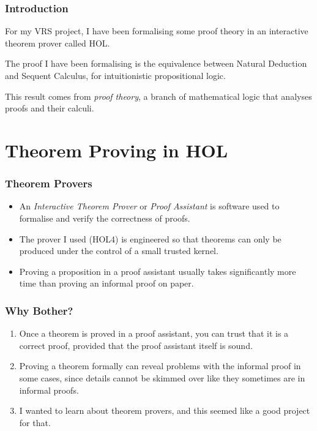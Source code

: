 \documentclass[english,svgnames,hide notes,12pt]{beamer}
\title{\large\presentationtitle}
\author{Alexander Cox\\
		\small Supervised by Michael Norrish\\
		\small The Australian National University
	}
\date{\today}
\theoremstyle{definition}
\theoremstyle{remark}
\begin{document}
\thispagestyle{empty}
\begin{frame}
    \titlepage{}
\end{frame}

\begin{frame}
    \frametitle{Introduction}
    For my VRS project, I have been formalising some proof theory in an interactive theorem prover called HOL. 

    \bigskip
    The proof I have been formalising is the equivalence between Natural Deduction and Sequent Calculus, for intuitionistic propositional logic.

    \bigskip
    This result comes from \emph{proof theory},  a branch of mathematical logic that analyses proofs and their calculi. 
\end{frame}

\section{Theorem Proving in HOL}

\begin{frame}
    \frametitle{Theorem Provers}
    \begin{itemize}
        \item An \emph{Interactive Theorem Prover} or \emph{Proof Assistant} is software used to formalise and verify the correctness of proofs.
        \item The prover I used (HOL4) is engineered so that theorems can only be produced under the control of a small trusted kernel.
        \item Proving a proposition in a proof assistant usually takes significantly more time than proving an informal proof on paper.
    \end{itemize}
\end{frame}

\begin{frame}
    \frametitle{Why Bother?}
    \begin{enumerate}
        \item Once a theorem is proved in a proof assistant, you can trust that it is a correct proof, provided that the proof assistant itself is sound.
        \item Proving a theorem formally can reveal problems with the informal proof in some cases, since details cannot be skimmed over like they sometimes are in informal proofs.
        \item I wanted to learn about theorem provers, and this seemed like a good project for that.
    \end{enumerate}
\end{frame}
\end{document}
